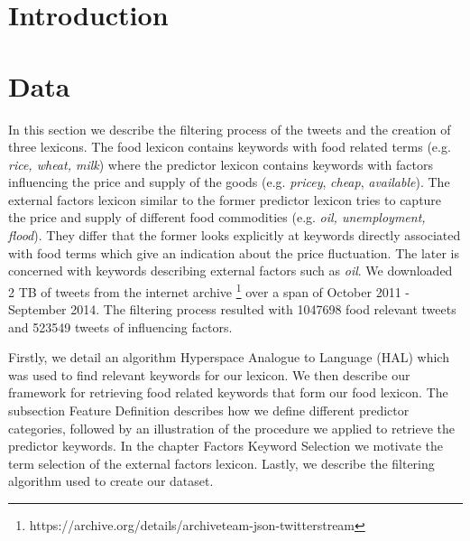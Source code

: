 \documentclass[12pt]{report}
\begin{document}
\setcounter{page}{1}
\chapter{Introduction}















\chapter{Data}
In this section we describe the filtering process of the tweets and the creation of three lexicons. The food lexicon contains keywords with food related terms (e.g. \emph {rice, wheat, milk}) where the predictor lexicon contains keywords with factors influencing the price and supply of the goods (e.g. \emph{pricey}, \emph {cheap}, \emph{available}). The external factors lexicon similar to the former predictor lexicon tries to capture the price and supply of different food commodities (e.g. \emph{oil, unemployment, flood}). They differ that the former looks explicitly at keywords directly associated with food terms which give an indication about the price fluctuation. The later is concerned with keywords describing external factors such as \emph{oil}. We downloaded 2 TB of tweets from the internet archive \footnote{https://archive.org/details/archiveteam-json-twitterstream} over a span of October 2011 - September 2014.  The filtering process resulted with 1047698 food relevant tweets and 523549 tweets of influencing factors. 

Firstly, we detail an algorithm Hyperspace Analogue to Language (HAL)  \cite{lund96} which was used to find relevant keywords for our lexicon. We then describe our framework for retrieving food related keywords that form our food lexicon. The subsection Feature Definition describes how we define different predictor categories, followed by an illustration of the procedure we applied to retrieve the predictor keywords. In the chapter Factors Keyword Selection we motivate the term selection of the external factors lexicon. Lastly, we describe the filtering algorithm used to create our dataset. 
\end{document}
